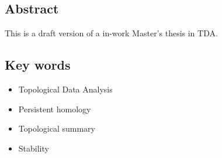 
\subsection*{Abstract}
This is a draft version of a in-work Master's thesis in TDA.


\subsection*{Key words}
\begin{itemize}
    \item Topological Data Analysis
    \item Persistent homology
    \item Topological summary
    \item Stability
\end{itemize}
